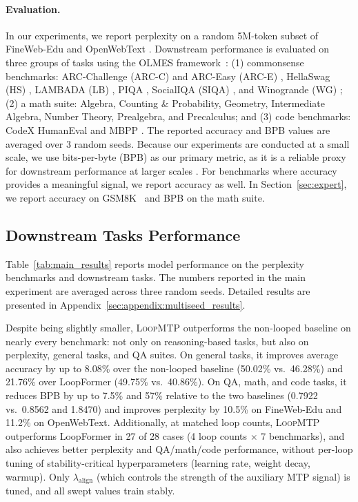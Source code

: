\paragraph{Evaluation.}

In our experiments, we report perplexity on a random 5M-token subset of FineWeb-Edu \citep{lozhkov2024fineweb-edu} and OpenWebText \citep{Gokaslan2019OpenWeb}. Downstream performance is evaluated on three groups of tasks using the OLMES framework~\citep{gu2025olmes}: (1) commonsense benchmarks: ARC-Challenge (ARC-C) and ARC-Easy (ARC-E) \citep{allenai:arc}, HellaSwag (HS) \citep{zellers2019hellaswag}, LAMBADA (LB) \citep{paperno2016lambada}, PIQA \citep{bisk2020piqa}, SocialIQA (SIQA) \citep{sap2019social}, and Winogrande (WG) \citep{sakaguchi2021winogrande}; (2) a math suite: Algebra, Counting \& Probability, Geometry, Intermediate Algebra, Number Theory, Prealgebra, and Precalculus; and (3) code benchmarks: CodeX HumanEval \citep{chen2021evaluating} and MBPP \citep{austin2021program}. The reported accuracy and BPB values are averaged over 3 random seeds.
Because our experiments are conducted at a small scale, we use bits-per-byte (BPB) as our primary metric, as it is a reliable proxy for downstream performance at larger scales \citep{gadre2025language, heineman2026signal}. 
For benchmarks where accuracy provides a meaningful signal, we report accuracy as well. In Section~\ref{sec:expert}, we report accuracy on GSM8K~\cite{cobbe2021gsm8k} and BPB on the math suite.









\subsection{Downstream Tasks Performance}
\label{sec:main_results}


Table~\ref{tab:main_results} reports model performance on the perplexity benchmarks and downstream tasks. 
The numbers reported in the main experiment are averaged across three random seeds. Detailed results are presented in Appendix~\ref{sec:appendix:multiseed_results}.

Despite being slightly smaller, \textsc{LoopMTP} outperforms the non-looped baseline on nearly every benchmark: not only on reasoning-based tasks,
but also on perplexity, general tasks, and QA suites. On general tasks, it improves average accuracy by up to 8.08\% over the non-looped baseline (50.02\% vs.\ 46.28\%) and 21.76\% over LoopFormer (49.75\% vs.\ 40.86\%). On QA, math, and code tasks, it reduces BPB by up to 7.5\% and 57\% relative to the two baselines (0.7922 vs.\ 0.8562 and 1.8470) and improves perplexity by 10.5\% on FineWeb-Edu and 11.2\% on OpenWebText.
Additionally, at matched loop counts, \textsc{LoopMTP} outperforms LoopFormer in 27 of 28 cases (4 loop counts $\times$ 7 benchmarks), and also achieves better perplexity and QA/math/code performance, without per-loop tuning of stability-critical hyperparameters (learning rate, weight decay, warmup). Only $\lambda_\text{align}$ (which controls the strength of the auxiliary MTP signal) is tuned, and all swept values train stably.
    
